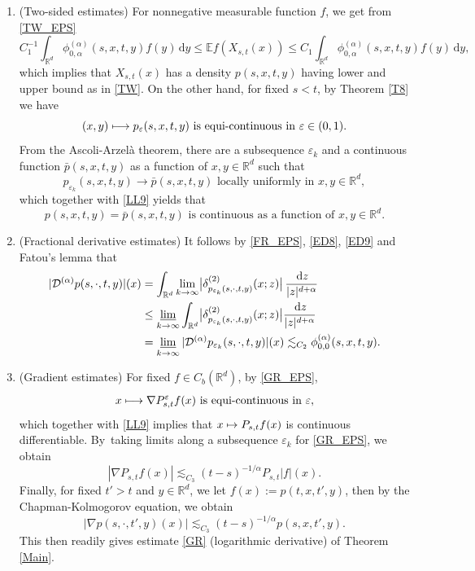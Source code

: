 \documentclass[JEP,XML,SOM,Unicode,published]{cedram}
\def\mto{\mathchoice{\longmapsto}{\mapsto}{\mapsto}{\mapsto}}
\theoremstyle{plain}
\theoremstyle{definition}
\let\eps\varepsilon
\newcommand\cD{{\mathcal D}}
\newcommand\mE{\mathbb{E}}
\newcommand\mR{\mathbb{R}}
\newcommand\1{{\mathbf{1}}}
\newcommand{\dif}{\,\mathrm{d}}
\begin{document}
\begin{enumerate}
\item
(Two-sided estimates) For nonnegative measurable function $f$, we get from \eqref{TW_EPS}
\begin{equation*}
C^{-1}_1\int_{\mR^d}\phi^{(\alpha)}_{0,\alpha}(s,x,t,y)f(y)\dif y\leq \mE f(X_{s,t}(x))\leq C_1\int_{\mR^d}\phi^{(\alpha)}_{0,\alpha}(s,x,t,y) f(y)\dif y,
\end{equation*}
which implies that $X_{s,t}(x)$ has a density $p(s,x,t,y)$ having lower and upper bound as in \eqref{TW}.
On the other hand, for fixed $s<t$, by Theorem \ref{T8} we have
\[
(x,y)\mto p_\eps(s,x,t,y) \text{ is equi-continuous in $\eps\in(0,1)$}.
\]
From the Ascoli-Arzelà theorem, there are a subsequence $\eps_k$ and a continuous function $\bar p(s,x,t,y)$ as a function of $x,y\in\mR^d$ such that
\begin{equation}\label{ED8}
p_{\eps_k}(s,x,t,y)\to \bar p(s,x,t,y) \text{ locally uniformly in $x,y\in\mR^d$},
\end{equation}
which together with \eqref{LL9} yields that
\begin{equation}\label{ED9}
p(s,x,t,y)=\bar p(s,x,t,y)\text{ is continuous as a function of $x,y\in\mR^d$.}
\end{equation}

\item
(Fractional derivative estimates)
It follows by \eqref{FR_EPS}, \eqref{ED8}, \eqref{ED9} and Fatou's lemma that
\begin{align*}
|\cD^{(\alpha)}{p(s,\cdot,t,y)}|(x)&=\int_{\mR^d}\lim_{k\to\infty}\bigl|\delta^{(2)}_{p_{\eps_k}(s,\cdot,t,y)}(x;z)\bigr|\,\frac{\dif z}{|z|^{d+\alpha}}\\
&\leq\varliminf_{k\to\infty}\int_{\mR^d}\bigl|\delta^{(2)}_{p_{\eps_k}(s,\cdot,t,y)}(x;z)\bigr|\frac{\dif z}{|z|^{d+\alpha}}\\
&=\varliminf_{k\to\infty}|\cD^{(\alpha)}{p_{\eps_k}(s,\cdot,t,y)}|(x)\lesssim_{C_2}\phi^{(\alpha)}_{0,0}(s,x,t,y).
\end{align*}

\item
(Gradient estimates) For fixed $f\in C_b(\mR^d)$, by \eqref{GR_EPS},
\[
x\mto\nabla P^\eps_{s,t}f(x) \text{ is equi-continuous in $\eps$},
\]
which together with \eqref{LL9} implies that $x\mto P_{s,t}f(x)$ is continuous differentiable.
By~taking limits along a subsequence $\eps_k$ for \eqref{GR_EPS}, we obtain
\[
|\nabla P_{s,t}f(x)|\lesssim_{C_3} (t-s)^{-1/\alpha}P_{s,t}|f|(x).
\]
Finally, for fixed $t'>t$ and $y\in\mR^d$, we let $f(x):=p(t,x,t',y)$, then by the Chapman-Kolmogorov equation, we obtain
\[
|\nabla p(s,\cdot,t',y)(x)|\lesssim_{C_3} (t-s)^{-1/\alpha}p(s,x,t',y).
\]
This then readily gives estimate \eqref{GR} (logarithmic derivative) of Theorem \ref{Main}.
\end{enumerate}
\end{document}
